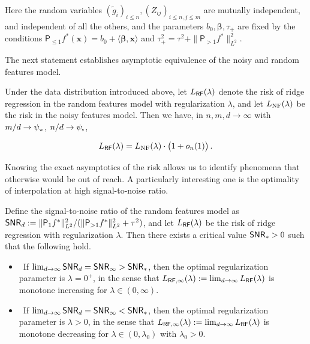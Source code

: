 Here the random variables $(\tilde{g}_i)_{i\le n}, (Z_{ij})_{i\le n, j\le m}$ are mutually independent, and independent of  all the others, and the parameters $b_0,{\boldsymbol \beta},\tau_+$  are fixed by the conditions
${\mathsf P}_{\le 1}f^*({\boldsymbol x}) = b_0+\langle{\boldsymbol \beta},{\boldsymbol x}\rangle$ and
$\tau_+^2=\tau^2+\|{\mathsf P}_{> 1}f^*\|_{L^2}^2$.

The next statement establishes asymptotic equivalence of the noisy and random features model. 

\begin{theorem}\label{thm:proportional}
  Under the data distribution introduced above, let ${L}_{{\sf RF}}(\lambda)$ denote the risk of ridge regression in the random features model with regularization $\lambda$, and let
  ${L}_{{\rm NF}}(\lambda)$ be the risk in the noisy features model. Then we have, in
  $n,m,d\to\infty$ with $m/d\to\psi_{\mbox{\rm\tiny w}}$, $n/d\to\psi_{\mbox{\rm\tiny s}}$, 

  \begin{align}
    {L}_{{\sf RF}}(\lambda) = {L}_{{\rm NF}}(\lambda)\cdot \big(1+o_n(1)\big)\, .
  \end{align}
\end{theorem}

Knowing the exact asymptotics of the risk allows us to identify phenomena that otherwise would be out of reach. A particularly interesting one is the optimality of interpolation at high signal-to-noise ratio.

\begin{corollary}
  Define the signal-to-noise ratio of the random features model  as  ${\sf SNR}_d:=\|{\mathsf P}_1 f^*\|_{L^2}^2/(\|{\mathsf P}_{>1} f^*\|_{L^2}^2+\tau^2)$,
  and let ${L}_{{\sf RF}}(\lambda)$ be the risk of ridge regression with regularization $\lambda$.
  Then there exists a critical value ${\sf SNR}_*>0$ such that the following hold.
\begin{itemize}
\item[$(i)$]~If $\lim_{d\to\infty}{\sf SNR}_{d}={\sf SNR}_{\infty}> {\sf SNR}_*$, then the optimal regularization parameter is $\lambda= 0^+$, in the  sense that ${L}_{{\sf RF},\infty}(\lambda):=\lim_{d\to\infty}{L}_{{\sf RF}}(\lambda)$ is monotone increasing for $\lambda\in(0,\infty)$.
 \item[$(ii)$]~If $\lim_{d\to\infty}{\sf SNR}_{d}={\sf SNR}_{\infty}< {\sf SNR}_*$, then the optimal regularization parameter is $\lambda > 0$, in the  sense that ${L}_{{\sf RF},\infty}(\lambda):=\lim_{d\to\infty}{L}_{{\sf RF}}(\lambda)$ is monotone decreasing for $\lambda\in(0,\lambda_0)$ with $\lambda_0>0$.
 \end{itemize}
 \end{corollary}

